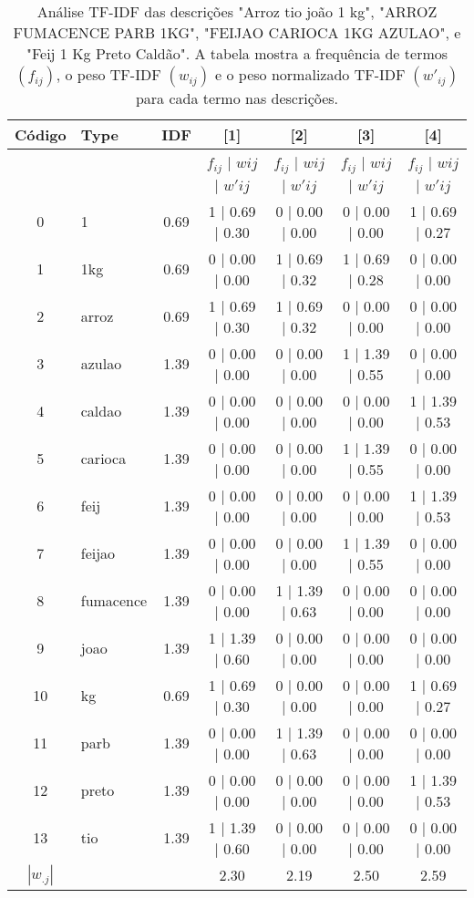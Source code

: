 \begin{table}[h]
    \centering
    \scriptsize
    \begin{tabular}{c|l|c|c|c|c|c}
    \hline
    Código & Type & IDF & [1] & [2] & [3] & [4] \\
    \hline
    {} & {} & {} & \( f_{ij} \) | \( wij \) | \( w'ij \) & \( f_{ij} \) | \( wij \) | \( w'ij \) & \( f_{ij} \) | \( wij \) | \( w'ij \) & \( f_{ij} \) | \( wij \) | \( w'ij \) \\
    \hline
    0  & 1         & 0.69 & 1 | 0.69 | 0.30 & 0 | 0.00 | 0.00 & 0 | 0.00 | 0.00 & 1 | 0.69 | 0.27 \\
    1  & 1kg       & 0.69 & 0 | 0.00 | 0.00 & 1 | 0.69 | 0.32 & 1 | 0.69 | 0.28 & 0 | 0.00 | 0.00 \\
    2  & arroz     & 0.69 & 1 | 0.69 | 0.30 & 1 | 0.69 | 0.32 & 0 | 0.00 | 0.00 & 0 | 0.00 | 0.00 \\
    3  & azulao    & 1.39 & 0 | 0.00 | 0.00 & 0 | 0.00 | 0.00 & 1 | 1.39 | 0.55 & 0 | 0.00 | 0.00 \\
    4  & caldao    & 1.39 & 0 | 0.00 | 0.00 & 0 | 0.00 | 0.00 & 0 | 0.00 | 0.00 & 1 | 1.39 | 0.53 \\
    5  & carioca   & 1.39 & 0 | 0.00 | 0.00 & 0 | 0.00 | 0.00 & 1 | 1.39 | 0.55 & 0 | 0.00 | 0.00 \\
    6  & feij      & 1.39 & 0 | 0.00 | 0.00 & 0 | 0.00 | 0.00 & 0 | 0.00 | 0.00 & 1 | 1.39 | 0.53 \\
    7  & feijao    & 1.39 & 0 | 0.00 | 0.00 & 0 | 0.00 | 0.00 & 1 | 1.39 | 0.55 & 0 | 0.00 | 0.00 \\
    8  & fumacence & 1.39 & 0 | 0.00 | 0.00 & 1 | 1.39 | 0.63 & 0 | 0.00 | 0.00 & 0 | 0.00 | 0.00 \\
    9  & joao      & 1.39 & 1 | 1.39 | 0.60 & 0 | 0.00 | 0.00 & 0 | 0.00 | 0.00 & 0 | 0.00 | 0.00 \\
    10 & kg        & 0.69 & 1 | 0.69 | 0.30 & 0 | 0.00 | 0.00 & 0 | 0.00 | 0.00 & 1 | 0.69 | 0.27 \\
    11 & parb      & 1.39 & 0 | 0.00 | 0.00 & 1 | 1.39 | 0.63 & 0 | 0.00 | 0.00 & 0 | 0.00 | 0.00 \\
    12 & preto     & 1.39 & 0 | 0.00 | 0.00 & 0 | 0.00 | 0.00 & 0 | 0.00 | 0.00 & 1 | 1.39 | 0.53 \\
    13 & tio       & 1.39 & 1 | 1.39 | 0.60 & 0 | 0.00 | 0.00 & 0 | 0.00 | 0.00 & 0 | 0.00 | 0.00 \\
    \hline
    $|w_{.j}|$ & & & 2.30 & 2.19 & 2.50 & 2.59 \\
    \hline
    \end{tabular}

    \caption{Análise TF-IDF das descrições "Arroz tio joão 1 kg", "ARROZ FUMACENCE PARB 1KG", "FEIJAO CARIOCA 1KG AZULAO", e "Feij 1 Kg Preto Caldão". A tabela mostra a frequência de termos $(f_{ij})$, o peso TF-IDF $(w_{ij})$ e o peso normalizado TF-IDF $(w'_{ij})$ para cada termo nas descrições.}
    \label{tab:tfidf}
\end{table}

